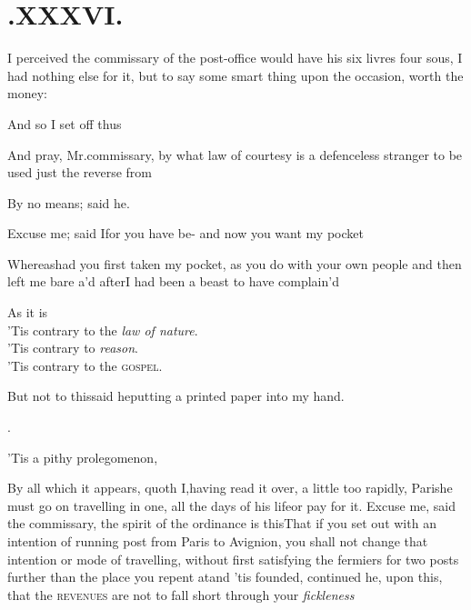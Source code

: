 \documentclass{article}
\begin{document}
\section{.\enspace XXXVI.}

 I perceived the commissary of the
post-office would have his six livres four sous, I had nothing else
for it, but to say some smart thing upon the occasion, worth the
money:

And so I set off thus\tsh{}

\tsh And pray, Mr.\@ commissary, by\break
what law of courtesy is a defenceless\break
stranger to be used just the reverse from\break
{}

By no means; said he.

Excuse me; said I\tsk for you have be-\break
{}\break
\tsk and now you want my pocket\tsh

Whereas\tsk had you first taken my pocket, as you do with your
own people\break
\tsk and then left me bare \hbox{a\tsk’d} after\tsk I had been a beast to have
complain’d\tsh

As it is\tsh\\
\tsh ’Tis contrary to the \textit{law of nature}.\\
\tsh ’Tis contrary to \textit{reason}.\\
\tsh ’Tis contrary to the \textsc{gospel}.

But not to this\tsh said he\tsk putting a printed
paper into my hand.\\
\centerline{.}
\etp{}
\newpage
\tsh\tsh ’Tis a pithy prolegomenon,
\break
\stick{\tsk \tsk \tsk \tsk \tsk \tsk \tsk \tsk \tsk \tsk \tsk \tsk}
\stick{\tsk \tsk \tsk \tsk \tsk \tsk \tsk \tsk \tsk \tsk \tsk \tsk}
\stick{\tsk \tsk \tsk \tsk \tsk \tsk \tsk \tsk \tsk \tsk \tsk \tsk}
\stick{\tsk \tsk \tsk \tsk \tsk \tsk \tsk \tsk \tsk \tsk \tsk \tsk}

\tsh By all which it appears, quoth I,\break having read it
over, a little too rapidly, 
Paris\tsk he must go on travelling in one, all the
days of his life\tsk or pay for it.\tsk\break
Excuse me, said the commissary, the spirit of the ordinance is
this\tsk That if you set out with an intention of running post
from Paris to Avignion\sic, \etc you shall not change that intention
or mode of travelling, without first satisfying the fermiers for
two posts further than the place you repent at\tsk and ’tis
founded, conti\-nued he, upon this, that the \textsc{revenues} are
not to fall short through your \textit{fickleness}\tsh
\end{document}

